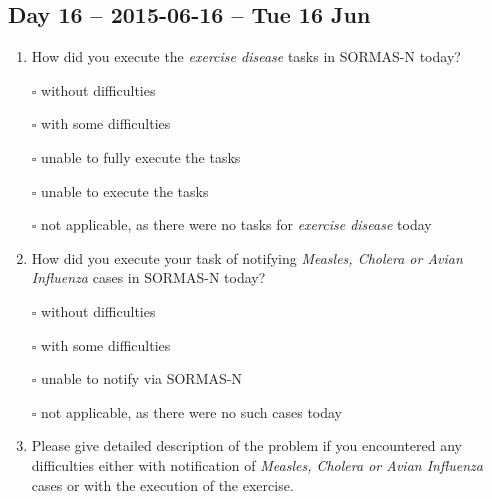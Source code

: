 \documentclass[a4paper, titlepage]{tufte-handout}
\begin{document}
\subsection{Day 16 -- 2015-06-16 -- Tue 16 Jun}
\label{sec-8-12}
\begin{enumerate}
\item How did you execute the \emph{exercise disease} tasks in SORMAS-N today?

\quad $\square$ without difficulties

\quad $\square$ with some difficulties

\quad $\square$ unable to fully execute the tasks

\quad $\square$ unable to execute the tasks

\quad $\square$ not applicable, as there were no tasks for \emph{exercise disease} today

\item How did you execute your task of notifying \emph{Measles, Cholera or Avian Influenza} cases in SORMAS-N today?

\quad $\square$ without difficulties

\quad $\square$ with some difficulties

\quad $\square$ unable to notify via SORMAS-N

\quad $\square$ not applicable, as there were no such cases today

\item Please give detailed description of the problem if you encountered any difficulties either with notification of \emph{Measles, Cholera or Avian Influenza} cases or with the execution of the exercise.

\hrulefill

\hrulefill

\hrulefill

\hrulefill

\hrulefill

\hrulefill

\hrulefill

\hrulefill

\hrulefill

\hrulefill
\end{enumerate}

\newpage
\end{document}
